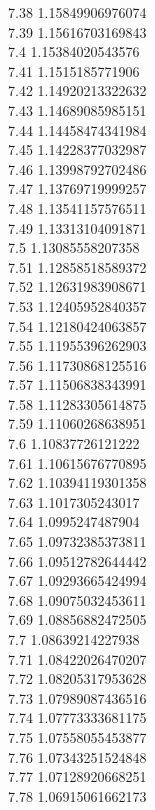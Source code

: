 {7.38	1.15849906976074\\
7.39	1.15616703169843\\
7.4	1.15384020543576\\
7.41	1.1515185771906\\
7.42	1.14920213322632\\
7.43	1.14689085985151\\
7.44	1.14458474341984\\
7.45	1.14228377032987\\
7.46	1.13998792702486\\
7.47	1.13769719999257\\
7.48	1.13541157576511\\
7.49	1.13313104091871\\
7.5	1.13085558207358\\
7.51	1.12858518589372\\
7.52	1.12631983908671\\
7.53	1.12405952840357\\
7.54	1.12180424063857\\
7.55	1.11955396262903\\
7.56	1.11730868125516\\
7.57	1.11506838343991\\
7.58	1.11283305614875\\
7.59	1.11060268638951\\
7.6	1.10837726121222\\
7.61	1.10615676770895\\
7.62	1.10394119301358\\
7.63	1.1017305243017\\
7.64	1.0995247487904\\
7.65	1.09732385373811\\
7.66	1.09512782644442\\
7.67	1.09293665424994\\
7.68	1.09075032453611\\
7.69	1.08856882472505\\
7.7	1.08639214227938\\
7.71	1.08422026470207\\
7.72	1.08205317953628\\
7.73	1.07989087436516\\
7.74	1.07773333681175\\
7.75	1.07558055453877\\
7.76	1.07343251524848\\
7.77	1.07128920668251\\
7.78	1.06915061662173\\
}
